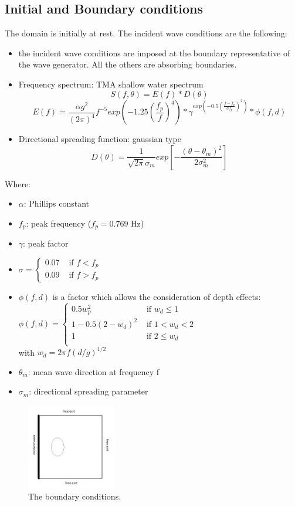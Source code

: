\subsection{Initial and Boundary conditions}
The domain is initially at rest.
The incident wave conditions are the following:
\begin{itemize}
\item the incident wave conditions are imposed at the boundary representative
  of the wave generator. All the others are absorbing boundaries.
\item Frequency spectrum: TMA shallow water spectrum
\[S(f,\theta) = E(f)*D(\theta) \]
\[E(f) = \frac{\alpha g^2}{(2\pi)^4}f^{-5} exp(-1.25(\frac{f_p}{f})^{4})*
\gamma^{exp(-0.5(\frac{f-f_p}{\sigma f_p})^{2})}*\phi (f,d)
\]
\item Directional spreading function: gaussian type
  \[D(\theta) = \frac{1}{\sqrt{2\pi}\sigma _m}exp[-\frac{(\theta -
      \theta _m)^2}{2\sigma^2_m}]
\]
\end{itemize}
Where:
\begin{itemize}
\item $\alpha$: Phillips constant
\item $f_p$: peak frequency ($f_p = 0.769$ Hz)
\item $\gamma $: peak factor
\item $\sigma = \left\{ \begin{array}{rl}
 0.07 &\mbox{ if $f<f_p$} \\
  0.09 &\mbox{ if $f>f_p$}
       \end{array} \right.$
\item $\phi (f,d)$ is a factor which allows the consideration of depth
  effects:\\
$\phi (f,d) = \left\{ \begin{array}{rl}
 0.5 w^2_p &\mbox{ if $w_d\le 1$} \\
  1-0.5(2-w_d)^2 &\mbox{ if $1<w_d<2$}\\
  1 &\mbox{ if $2 \le w_d$} \\
       \end{array} \right.$\\
       with $w_d = 2\pi f(d/g)^{1/2}$
       \item$\theta _m$: mean wave direction at frequency f
       \item $\sigma _m$: directional spreading parameter
\end{itemize}
\begin{figure}[h!]
  \centering
    \includegraphics[width=0.35\textwidth]{boundary_limit.png}
      \caption{The boundary conditions.}
\end{figure}


